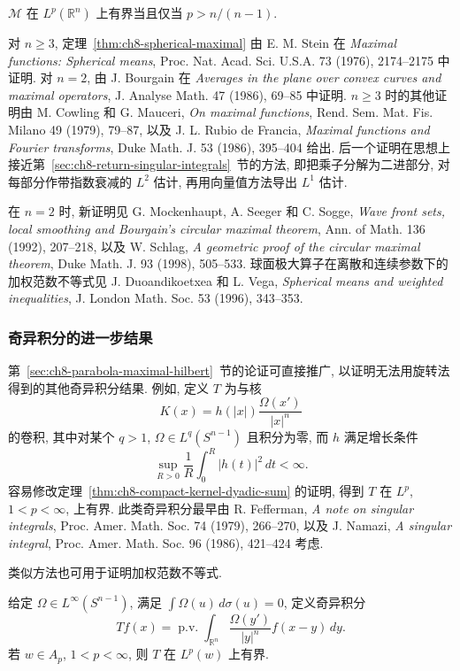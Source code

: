 \begin{Theorem}
\label{thm:ch8-spherical-maximal}
$\mathcal M$ 在 $L^p(\mathbb R^n)$ 上有界当且仅当 $p>n/(n-1)$.
\end{Theorem}

对 $n\ge3$, 定理~\ref{thm:ch8-spherical-maximal} 由 E. M. Stein 在 \textit{Maximal functions: Spherical means}, Proc. Nat. Acad. Sci. U.S.A. 73 (1976), 2174--2175 中证明. 对 $n=2$, 由 J. Bourgain 在 \textit{Averages in the plane over convex curves and maximal operators}, J. Analyse Math. 47 (1986), 69--85 中证明. $n\ge3$ 时的其他证明由 M. Cowling 和 G. Mauceri, \textit{On maximal functions}, Rend. Sem. Mat. Fis. Milano 49 (1979), 79--87, 以及 J. L. Rubio de Francia, \textit{Maximal functions and Fourier transforms}, Duke Math. J. 53 (1986), 395--404 给出. 后一个证明在思想上接近第~\ref{sec:ch8-return-singular-integrals}~节的方法, 即把乘子分解为二进部分, 对每部分作带指数衰减的 $L^2$ 估计, 再用向量值方法导出 $L^1$ 估计.

在 $n=2$ 时, 新证明见 G. Mockenhaupt, A. Seeger 和 C. Sogge, \textit{Wave front sets, local smoothing and Bourgain's circular maximal theorem}, Ann. of Math. 136 (1992), 207--218, 以及 W. Schlag, \textit{A geometric proof of the circular maximal theorem}, Duke Math. J. 93 (1998), 505--533. 球面极大算子在离散和连续参数下的加权范数不等式见 J. Duoandikoetxea 和 L. Vega, \textit{Spherical means and weighted inequalities}, J. London Math. Soc. 53 (1996), 343--353.

\hypertarget{chapter-08-page-204}{}
\subsubsection{奇异积分的进一步结果}
\label{subsec:ch8-further-singular-integrals}

第~\ref{sec:ch8-parabola-maximal-hilbert}~节的论证可直接推广, 以证明无法用旋转法得到的其他奇异积分结果. 例如, 定义 $T$ 为与核
\[
 K(x)=h(|x|)\frac{\Omega(x')}{|x|^n}
\]
的卷积, 其中对某个 $q>1$, $\Omega\in L^q(S^{n-1})$ 且积分为零, 而 $h$ 满足增长条件
\[
 \sup_{R>0}\frac1R\int_0^R|h(t)|^2\,dt<\infty.
\]
容易修改定理~\ref{thm:ch8-compact-kernel-dyadic-sum} 的证明, 得到 $T$ 在 $L^p$, $1<p<\infty$, 上有界. 此类奇异积分最早由 R. Fefferman, \textit{A note on singular integrals}, Proc. Amer. Math. Soc. 74 (1979), 266--270, 以及 J. Namazi, \textit{A singular integral}, Proc. Amer. Math. Soc. 96 (1986), 421--424 考虑.

类似方法也可用于证明加权范数不等式.

\begin{Theorem}
\label{thm:ch8-weighted-rough-singular-integral}
给定 $\Omega\in L^\infty(S^{n-1})$, 满足 $\int\Omega(u)\,d\sigma(u)=0$, 定义奇异积分
\[
 Tf(x)=\operatorname{p.v.}\int_{\mathbb R^n}
 \frac{\Omega(y')}{|y|^n}f(x-y)\,dy.
\]
若 $w\in A_p$, $1<p<\infty$, 则 $T$ 在 $L^p(w)$ 上有界.
\end{Theorem}

